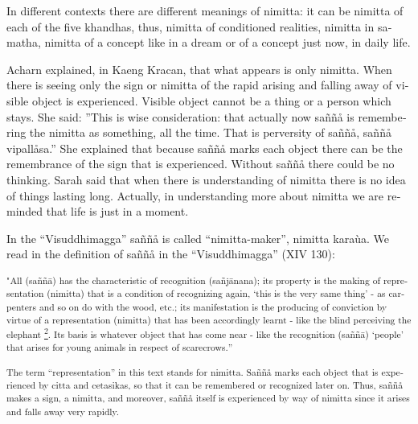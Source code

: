 \textdutch{In different contexts there are different meanings of
nimitta: it can be nimitta of each of the five khandhas, thus, nimitta
of conditioned realities, nimitta in samatha, nimitta of a concept like
in a dream or of a concept just now, in daily life. }

\textdutch{Acharn explained, in Kaeng Kracan, that what appears is only
nimitta. When there is seeing only the sign or nimitta of the rapid
arising and falling away of visible object is experienced. Visible
object cannot be a thing or a person which stays. She said: ''This is
wise consideration: that actually now saññå is remembering the nimitta
as something, all the time. That is perversity of saññå, saññå
vipallåsa.'' She explained that because saññå marks each object there
can be the remembrance of the sign that is experienced. Without saññå
there could be no thinking. Sarah said that when there is understanding
of nimitta there is no idea of things lasting long. Actually, in
understanding more about nimitta we are reminded that life is just in a
moment. }

\textdutch{In the ``Visuddhimagga'' saññå is called ``nimitta-maker'',
nimitta karaùa. We read in the definition of saññå in the
``Visuddhimagga'' }(XIV 130)\textdutch{:}

\textsuperscript{{{"}}{{All
(sa}}{{ññ}}{{ā}}\textenglish[variant=american]{{{) has the
characteristic of recognition
(sa}}}{{ñ}}{{j}}{{ā}}\textenglish[variant=american]{{{nana); its
property is the making of representation (nimitta) that is a condition
of recognizing again, `this is the very same thing' - as carpenters and
so on do with the wood, etc.; its manifestation is the producing of
conviction by virtue of a representation (nimitta) that has been
accordingly learnt - like the blind perceiving the
elephant}}}\textdutch{{{
\protect\hyperlink{sdfootnote2sym}{\textsuperscript{2}}}}}\textenglish[variant=american]{{{.
Its basis is whatever object that has come near - like the recognition
(sa}}}{{ññ}}{{ā}}\textenglish[variant=american]{{{) `people' that arises
for young animals in respect of scarecrows.}}}\textdutch{{{''}}}}

\textsuperscript{\textdutch{{{The term ``representation'' in this text
stands for nimitta. Saññå marks each object that is experienced by citta
and cetasikas, so that it can be remembered or recognized later on.
Thus, saññå makes a sign, a nimitta, and moreover, saññå itself is
experienced by way of nimitta since it arises and falls away very
rapidly. }}}}

